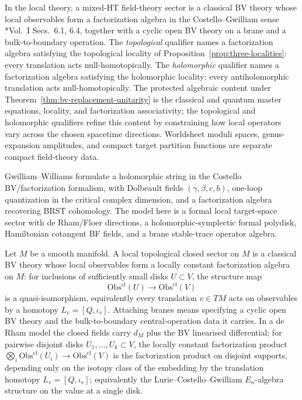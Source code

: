 \documentclass[11pt]{memoir}
\begin{document}
In the local theory, a mixed-HT field-theory sector is a
classical BV theory whose local observables form a factorization
algebra in the Costello--Gwilliam sense
\cite{costello-gwilliam}*{Vol.~I Secs.~6.1, 6.4}, together with a cyclic open BV theory on a
brane and a bulk-to-boundary operation.  The
\emph{topological} qualifier names a factorization algebra
satisfying the topological locality of
Proposition~\ref{prop:three-localities}: every translation acts
null-homotopically.  The \emph{holomorphic} qualifier names a
factorization algebra satisfying the holomorphic locality: every
antiholomorphic translation acts null-homotopically.  The protected
algebraic content under
Theorem~\ref{thm:bv-replacement-unitarity} is the classical and
quantum master equations, locality, and factorization associativity;
the topological and holomorphic qualifiers refine this content by
constraining how local operators vary across the chosen spacetime
directions.  Worldsheet moduli spaces, genus-expansion amplitudes, and
compact target partition functions are separate compact field-theory
data.

Gwilliam--Williams \cite{gwilliam-williams-holomorphic-bosonic-string}
formulate a holomorphic string in the Costello BV/factorization
formalism, with Dolbeault fields \((\gamma,\beta,c,b)\), one-loop
quantization in the critical complex dimension, and a factorization
algebra recovering BRST cohomology.  The model here is a formal local
target-space sector with de Rham/Floer directions, a
holomorphic-symplectic formal polydisk, Hamiltonian cotangent BF fields,
    and a brane stable-trace operator algebra.

\begin{defn}
\label{def:local-topological-string-sector}
  Let \(M\) be a smooth manifold.  A local topological closed
  sector on \(M\) is a classical BV theory whose local observables
  form a locally constant factorization algebra on \(M\): for
  inclusions of sufficiently small disks \(U\subset V\), the
  structure map
  \[
    \mathrm{Obs}^{\mathrm{cl}}(U)\longrightarrow
    \mathrm{Obs}^{\mathrm{cl}}(V)
  \]
  is a quasi-isomorphism, equivalently every translation
  \(v\in TM\) acts on observables by a homotopy
  \(L_v=[Q,\iota_v]\).  Attaching branes means specifying a cyclic
  open BV theory and the bulk-to-boundary central-operation data it
  carries.  In a de Rham model the closed fields carry \(d_M\) plus
  the BV linearised differential; for pairwise disjoint disks
  \(U_1,\ldots,U_k\subset V\), the locally constant factorization
  product
  \(\bigotimes_i\mathrm{Obs}^{\mathrm{cl}}(U_i)\to
  \mathrm{Obs}^{\mathrm{cl}}(V)\) is the factorization product on disjoint
  supports, depending only on the isotopy class of the embedding by
  the translation homotopy \(L_v=[Q,\iota_v]\); equivalently the
  Lurie--Costello--Gwilliam \(E_n\)-algebra structure on the value at a
  single disk.
\end{defn}
\end{document}
